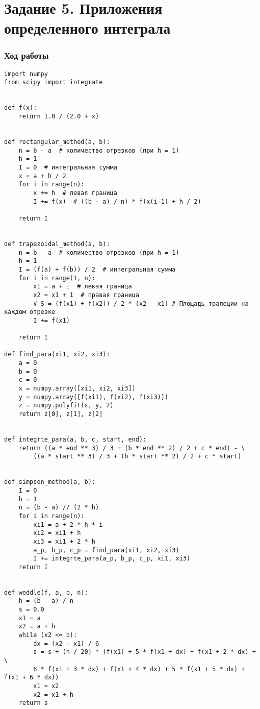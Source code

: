 \documentclass{article}
\newenvironment{codelisting}{\captionsetup{type=listing}}{}
\begin{document}
\newpage

\section{Задание 5. Приложения определенного интеграла}

\subsubsection*{Ход работы}

\begin{codelisting}
\begin{verbatim}
import numpy
from scipy import integrate


def f(x):
    return 1.0 / (2.0 + x)


def rectangular_method(a, b):
    n = b - a  # количество отрезков (при h = 1)
    h = 1
    I = 0  # интегральная сумма
    x = a + h / 2
    for i in range(n):
        x += h  # левая граница
        I += f(x)  # ((b - a) / n) * f(x(i-1) + h / 2)

    return I


def trapezoidal_method(a, b):
    n = b - a  # количество отрезков (при h = 1)
    h = 1
    I = (f(a) + f(b)) / 2  # интегральная сумма
    for i in range(1, n):
        x1 = a + i  # левая граница
        x2 = x1 + 1  # правая граница
        # S = (f(x1) + f(x2)) / 2 * (x2 - x1) # Площадь трапеции на каждом отрезке
        I += f(x1)

    return I

def find_para(xi1, xi2, xi3):
    a = 0
    b = 0
    c = 0
    x = numpy.array([xi1, xi2, xi3])
    y = numpy.array([f(xi1), f(xi2), f(xi3)])
    z = numpy.polyfit(x, y, 2)
    return z[0], z[1], z[2]


def integrte_para(a, b, c, start, end):
    return ((a * end ** 3) / 3 + (b * end ** 2) / 2 + c * end) - \
        ((a * start ** 3) / 3 + (b * start ** 2) / 2 + c * start)


def simpson_method(a, b):
    I = 0
    h = 1
    n = (b - a) // (2 * h)
    for i in range(n):
        xi1 = a + 2 * h * i
        xi2 = xi1 + h
        xi3 = xi1 + 2 * h
        a_p, b_p, c_p = find_para(xi1, xi2, xi3)
        I += integrte_para(a_p, b_p, c_p, xi1, xi3)
    return I


def weddle(f, a, b, n):
    h = (b - a) / n
    s = 0.0
    x1 = a
    x2 = a + h
    while (x2 <= b):
        dx = (x2 - x1) / 6
        s = s + (h / 20) * (f(x1) + 5 * f(x1 + dx) + f(x1 + 2 * dx) + \
        6 * f(x1 + 3 * dx) + f(x1 + 4 * dx) + 5 * f(x1 + 5 * dx) + f(x1 + 6 * dx))
        x1 = x2
        x2 = x1 + h
    return s


\end{verbatim}
\end{codelisting}
\end{document}
